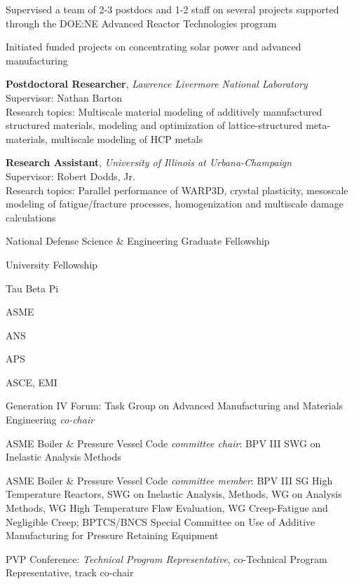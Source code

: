 Supervised a team of 2-3 postdocs and 1-2 staff on several projects
supported through the DOE:NE Advanced Reactor Technologies program

Initiated funded projects on concentrating solar power and advanced manufacturing

\textbf{Postdoctoral Researcher}, \emph{Lawrence Livermore National
Laboratory} \\
Supervisor: Nathan Barton \\
Research topics: Multiscale material modeling of additively manufactured
structured materials, modeling and optimization of lattice-structured
meta-materials, multiscale modeling of HCP metals

\textbf{Research Assistant}, \emph{University of Illinois at Urbana-Champaign}
\\
Supervisor: Robert Dodds, Jr. \\
Research topics: Parallel performance of WARP3D, crystal plasticity,
mesoscale modeling of fatigue/fracture processes, homogenization and
multiscale damage calculations


National Defense Science \& Engineering Graduate Fellowship 

University Fellowship 

Tau Beta Pi 


ASME 

ANS 

APS 

ASCE, EMI 


Generation IV Forum:  Task Group on Advanced Manufacturing and Materials Engineering \emph{co-chair} 

ASME Boiler \& Pressure Vessel Code \emph{committee chair}:  BPV III SWG on Inelastic Analysis Methods 

ASME Boiler \& Pressure Vessel Code \emph{committee member}:  BPV III SG High Temperature Reactors,
SWG on Inelastic Analysis,
Methods, WG on Analysis Methods, WG High Temperature Flaw Evaluation, 
WG Creep-Fatigue and Negligible Creep; BPTCS/BNCS Special Committee on 
Use of Additive Manufacturing for Pressure Retaining Equipment 

PVP Conference:  \emph{Technical Program Representative}, co-Technical Program Representative, track co-chair

